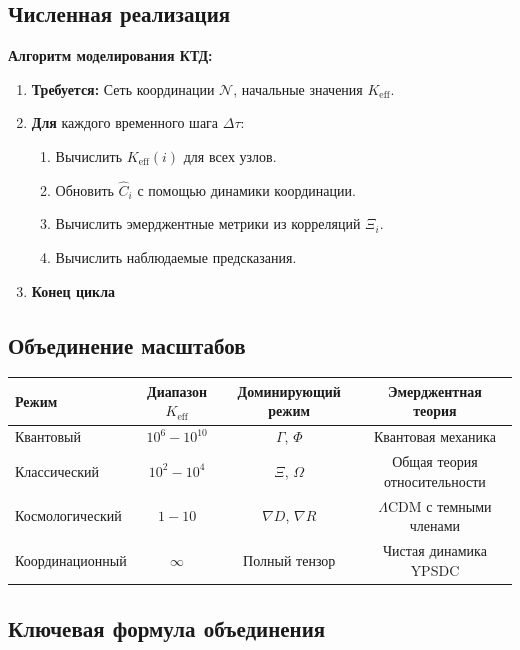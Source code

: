 \documentclass[11pt,a4paper]{article}
\begin{document}
	\subsection{Численная реализация}
	
	\textbf{Алгоритм моделирования КТД:}
	\begin{enumerate}
		\item \textbf{Требуется:} Сеть координации $\mathcal{N}$, начальные значения $K_{\mathrm{eff}}$.
		\item \textbf{Для} каждого временного шага $\Delta\tau$:
		\begin{enumerate}
			\item Вычислить $K_{\mathrm{eff}}(i)$ для всех узлов.
			\item Обновить $\hat{C}_i$ с помощью динамики координации.
			\item Вычислить эмерджентные метрики из корреляций $\Xi_i$.
			\item Вычислить наблюдаемые предсказания.
		\end{enumerate}
		\item \textbf{Конец цикла}
	\end{enumerate}
	
	\subsection{Объединение масштабов}
	
	\begin{table}[htbp]
		\centering
		\begin{tabular}{lccc}
			\toprule
			\textbf{Режим} & \textbf{Диапазон $K_{\mathrm{eff}}$} & \textbf{Доминирующий режим} & \textbf{Эмерджентная теория} \\
			\midrule
			Квантовый & $10^6-10^{10}$ & $\Gamma$, $\Phi$ & Квантовая механика \\
			Классический & $10^2-10^4$ & $\Xi$, $\Omega$ & Общая теория относительности \\
			Космологический & $1-10$ & $\nabla D$, $\nabla R$ & $\Lambda$CDM с темными членами \\
			Координационный & $\infty$ & Полный тензор & Чистая динамика YPSDC \\
			\bottomrule
		\end{tabular}
	\end{table}
	
	\subsection{Ключевая формула объединения}
	
\end{document}
